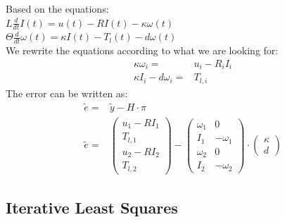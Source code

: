 \documentclass[10pt,a4paper]{scrartcl}
\begin{document}
\begin{multicols*}{3}
Based on the equations:\\
$L\frac{d}{dt}I(t)=u(t)-RI(t)-\kappa \omega(t)$\\
$\Theta \frac{d}{dt}\omega(t)=\kappa I(t)-T_l(t)-d\omega(t)$\\
We rewrite the equations according to what we are looking for:
\begin{align*}
\kappa\omega_i =&u_i-R_iI_i\\
\kappa I_i-d\omega_i =&T_{l,i}
\end{align*}
The error can be written as:
\begin{align*}
\tilde e =&\tilde y - H \cdot \pi\\
\tilde e =&\begin{pmatrix} u_1-RI_1\\T_{l,1}\\u_2-RI_2\\T_{l,2}\end{pmatrix}-\begin{pmatrix} \omega_1&0\\I_1 &-\omega_1\\ \omega_2&0\\I_2 &-\omega_2\end{pmatrix}\cdot\begin{pmatrix} \kappa \\d\end{pmatrix}
\end{align*}


\vfill
\null
\columnbreak

\subsection{Iterative Least Squares}


\end{multicols*}
\end{document}

